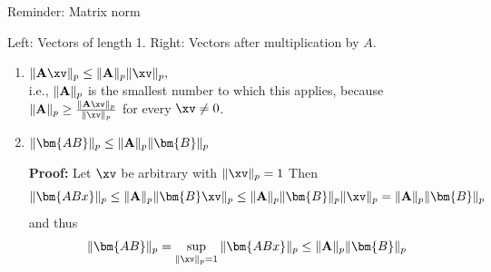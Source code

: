 \begin{vbframe}{Reminder: Matrix norm}
\begin{center}
\begin{footnotesize}
Left: Vectors of length 1. Right: Vectors after multiplication by $A$.
\end{footnotesize}
\end{center}

\framebreak

\begin{enumerate}
\item $ \|\Amat \xv\|_p \leq \|\Amat\|_p\|\xv\|_p,$ \\ 
  i.e., $\|\mathbf{A}\|_p$ is the smallest number to which this applies,
  because $\|\Amat\|_p \geq \frac{\|\Amat \xv\|_p}{\|\xv\|_p}$ for every $\xv \not= 0$.
  
\item $ \|\bm{AB}\|_p \leq \|\Amat\|_p \|\bm{B}\|_p$\\
  \vspace{0.2cm}
  \begin{footnotesize}
  \textbf{Proof:}
  Let $\xv$ be arbitrary with $\|\xv\|_p = 1$ Then
  $$
  \|\bm{ABx}\|_p \leq \|\Amat\|_p \|\bm{B}\xv\|_p \leq \|\Amat\|_p \|\bm{B}\|_p \|\xv\|_p = \|\Amat\|_p \|\bm{B}\|_p
  $$
  and thus 
  $$
  \|\bm{AB}\|_p = \sup_{\|\xv\|_p = 1} \|\bm{ABx}\|_p \leq \|\Amat\|_p \|\bm{B}\|_p
  $$
  
  \end{footnotesize}
  
\end{enumerate}



\end{vbframe}



\endlecture

